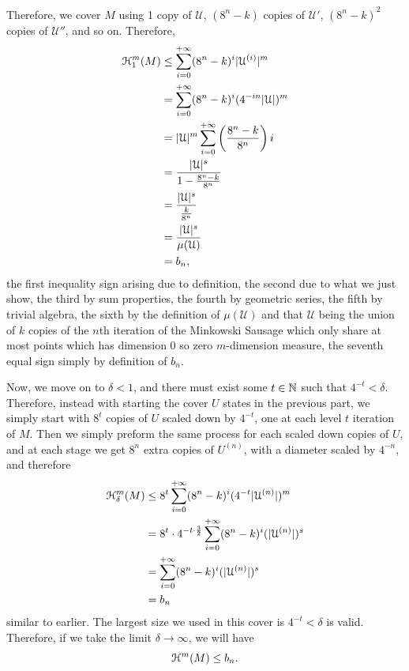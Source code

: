 Therefore, we cover \(M\) using 1 copy of \(\mathcal{U}\), \((8^n - k)\) copies of \(\mathcal{U}'\), \((8^n - k)^2\) copies of \(\mathcal{U}''\), and so on. Therefore,
\begin{align*}
    \mathcal{H}_1^m(M) &\leq \sum_{i = 0}^{+\infty} (8^n - k)^i |\mathcal{U}^{(i)}|^m\\
    &= \sum_{i = 0}^{+\infty} (8^n - k)^i (4^{-in} |\mathcal{U}|)^m\\
    &= |\mathcal{U}|^m \sum_{i = 0}^{+\infty} \left(\frac{8^n - k}{8^n}\right)i\\
    &= \frac{|\mathcal{U}|^s}{1 - \frac{8^n - k}{8^n}}\\
    &= \frac{|\mathcal{U}|^s}{\frac{k}{8^n}}\\
    &= \frac{|\mathcal{U}|^s}{\mu(\mathcal{U})}\\
    &= b_n,
\end{align*}
the first inequality sign arising due to definition, the second due to what we just show, the third by sum properties, the fourth by geometric series, the fifth by trivial algebra, the sixth by the definition of \(\mu(\mathcal{U})\) and that \(\mathcal{U}\) being the union of \(k\) copies of the \(n\)th iteration of the Minkowski Sausage which only share at most points which has dimension \(0\) so zero \(m\)-dimension measure, the seventh equal sign simply by definition of \(b_n\).

Now, we move on to \(\delta < 1\), and there must exist some \(t \in \mathbb{N}\) such that \(4^{-t} < \delta\). Therefore, instead with starting the cover \(U\) states in the previous part, we simply start with \(8^t\) copies of \(U\) scaled down by \(4^{-t}\), one at each level \(t\) iteration of \(M\). Then we simply preform the same process for each scaled down copies of \(U\), and at each stage we get \(8^n\) extra copies of \(U^{(n)}\), with a diameter scaled by \(4^{-n}\), and therefore
\begin{align*}
    \mathcal{H}_{\delta}^m(M) &\leq 8^t \sum_{i = 0}^{+\infty} (8^n - k)^i (4^{-t} |\mathcal{U}^{(n)}|)^m\\
    &= 8^t \cdot 4^{-t \cdot \frac{3}{2}} \sum_{i = 0}^{+\infty} (8^n - k)^i (|\mathcal{U}^{(n)}|)^s\\
    &= \sum_{i = 0}^{+\infty} (8^n - k)^i (|\mathcal{U}^{(n)}|)^s\\
    &= b_n
\end{align*}
similar to earlier. The largest size we used in this cover is \(4^{-t} < \delta\) is valid. Therefore, if we take the limit \(\delta \to \infty\), we will have
\[
\mathcal{H}^m(M) \leq b_n.
\]

